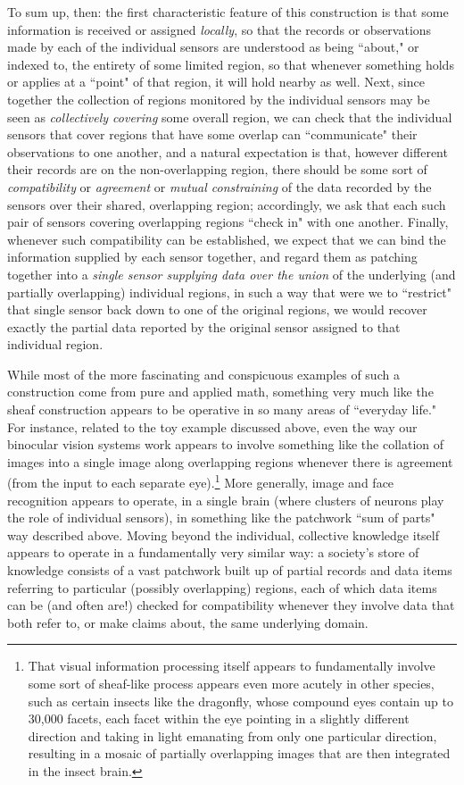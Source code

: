 \documentclass[a4paper]{book}
\theoremstyle{definition}
\theoremstyle{definition}
\theoremstyle{definition}
\theoremstyle{theorem}
\theoremstyle{definition}
\begin{document}
	To sum up, then: the first characteristic feature of this construction is that some information is received or assigned \textit{locally}, so that the records or observations made by each of the individual sensors are understood as being ``about," or indexed to, the entirety of some limited region, so that whenever something holds or applies at a ``point" of that region, it will hold nearby as well. Next, since together the collection of regions monitored by the individual sensors may be seen as \textit{collectively covering} some overall region, we can check that the individual sensors that cover regions that have some overlap can ``communicate" their observations to one another, and a natural expectation is that, however different their records are on the non-overlapping region, there should be some sort of \textit{compatibility} or \textit{agreement} or \textit{mutual constraining} of the data recorded by the sensors over their shared, overlapping region; accordingly, we ask that each such pair of sensors covering overlapping regions ``check in" with one another. Finally, whenever such compatibility can be established, we expect that we can bind the information supplied by each sensor together, and regard them as patching together into a \textit{single sensor supplying data over the union} of the underlying (and partially overlapping) individual regions, in such a way that were we to ``restrict" that single sensor back down to one of the original regions, we would recover exactly the partial data reported by the original sensor assigned to that individual region. \par 
	While most of the more fascinating and conspicuous examples of such a construction come from pure and applied math, something very much like the sheaf construction appears to be operative in so many areas of ``everyday life." For instance, related to the toy example discussed above, even the way our binocular vision systems work appears to involve something like the collation of images into a single image along overlapping regions whenever there is agreement (from the input to each separate eye).\footnote{That visual information processing itself appears to fundamentally involve some sort of sheaf-like process appears even more acutely in other species, such as certain insects like the dragonfly, whose compound eyes contain up to 30,000 facets, each facet within the eye pointing in a slightly different direction and taking in light emanating from only one particular direction, resulting in a mosaic of partially overlapping images that are then integrated in the insect brain.} More generally, image and face recognition appears to operate, in a single brain (where clusters of neurons play the role of individual sensors), in something like the patchwork ``sum of parts" way described above. Moving beyond the individual, collective knowledge itself appears to operate in a fundamentally very similar way: a society's store of knowledge consists of a vast patchwork built up of partial records and data items referring to particular (possibly overlapping) regions, each of which data items can be (and often are!) checked for compatibility whenever they involve data that both refer to, or make claims about, the same underlying domain. \par 
\end{document}
